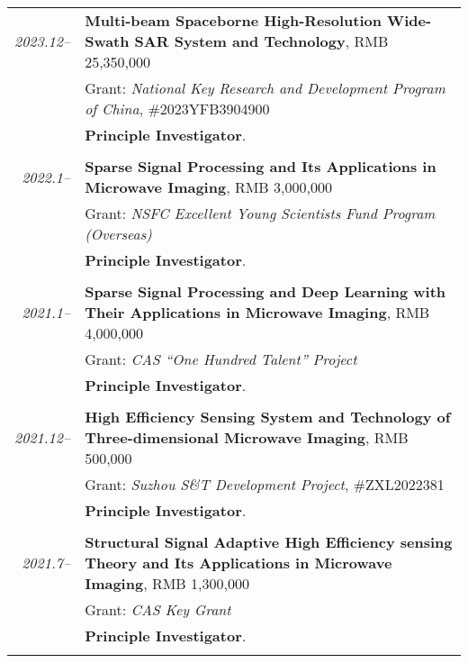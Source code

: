 \documentclass[paper=a4,fontsize=11pt]{scrartcl}
\begin{document}
\begin{longtable}{r|p{12cm}}
	
	\emph{2023.12--} & \textbf{Multi-beam Spaceborne High-Resolution Wide-Swath SAR System and Technology}, RMB 25,350,000 \\
	& Grant: \emph{National Key Research and Development Program of China}, \#2023YFB3904900\\
	& \textbf{Principle Investigator}.\\
	\multicolumn{2}{c}{} \\
	
	\emph{2022.1--} & \textbf{Sparse Signal Processing and Its Applications in Microwave Imaging}, RMB 3,000,000 \\
	& Grant: \emph{NSFC Excellent Young Scientists Fund Program (Overseas)}\\
	& \textbf{Principle Investigator}.\\
	\multicolumn{2}{c}{} \\
	
	\emph{2021.1--} & \textbf{Sparse Signal Processing and Deep Learning with Their Applications in Microwave Imaging}, RMB 4,000,000 \\
	& Grant: \emph{CAS ``One Hundred Talent'' Project}\\
	& \textbf{Principle Investigator}.\\
	\multicolumn{2}{c}{} \\
	
	\emph{2021.12--} & \textbf{High Efficiency Sensing System and Technology of Three-dimensional Microwave Imaging}, RMB 500,000 \\
	& Grant: \emph{Suzhou S\&T Development Project}, \#ZXL2022381\\
	& \textbf{Principle Investigator}.\\
	\multicolumn{2}{c}{} \\
	
	\emph{2021.7--} & \textbf{Structural Signal Adaptive High Efficiency sensing Theory and Its Applications in Microwave Imaging}, RMB 1,300,000 \\
	& Grant: \emph{CAS Key Grant}\\
	& \textbf{Principle Investigator}.\\
	\multicolumn{2}{c}{} \\
	

\end{longtable}
\end{document}
